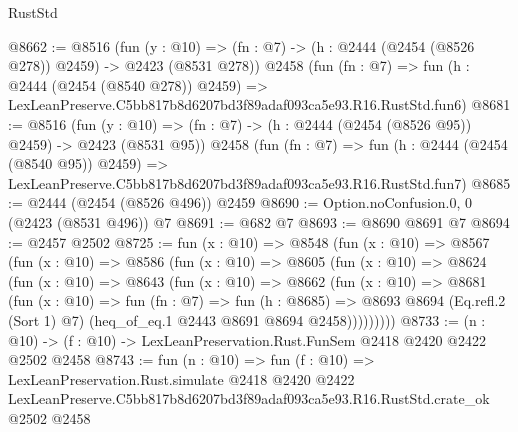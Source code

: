 \begin{lexlean}{RustStd}
\begin{coremodule}
@8662 := @8516
    (fun (y : @10) => (fn : @7) -> (h : @2444 (@2454 (@8526 @278)) @2459) -> @2423 (@8531 @278))
    @2458
    (fun (fn : @7) =>
    fun (h : @2444 (@2454 (@8540 @278)) @2459) =>
    LexLeanPreserve.C5bb817b8d6207bd3f89adaf093ca5e93.R16.RustStd.fun6)
@8681 := @8516
    (fun (y : @10) => (fn : @7) -> (h : @2444 (@2454 (@8526 @95)) @2459) -> @2423 (@8531 @95))
    @2458
    (fun (fn : @7) =>
    fun (h : @2444 (@2454 (@8540 @95)) @2459) =>
    LexLeanPreserve.C5bb817b8d6207bd3f89adaf093ca5e93.R16.RustStd.fun7)
@8685 := @2444 (@2454 (@8526 @496)) @2459
@8690 := Option.noConfusion.{0, 0} (@2423 (@8531 @496)) @7
@8691 := @682 @7
@8693 := @8690 @8691 @7
@8694 := @2457 @2502
@8725 := fun (x : @10) =>
  @8548
    (fun (x : @10) =>
    @8567
      (fun (x : @10) =>
      @8586
        (fun (x : @10) =>
        @8605
          (fun (x : @10) =>
          @8624
            (fun (x : @10) =>
            @8643
              (fun (x : @10) =>
              @8662
                (fun (x : @10) =>
                @8681
                  (fun (x : @10) =>
                  fun (fn : @7) =>
                  fun (h : @8685) =>
                  @8693
                    @8694
                    (Eq.refl.{2} (Sort 1) @7)
                    (heq_of_eq.{1} @2443 @8691 @8694 @2458)))))))))
@8733 := (n : @10) -> (f : @10) -> LexLeanPreservation.Rust.FunSem @2418 @2420 @2422 @2502 @2458
@8743 := fun (n : @10) =>
  fun (f : @10) =>
  LexLeanPreservation.Rust.simulate
    @2418
    @2420
    @2422
    LexLeanPreserve.C5bb817b8d6207bd3f89adaf093ca5e93.R16.RustStd.crate_ok
    @2502
    @2458
\end{coremodule}
\end{lexlean}
